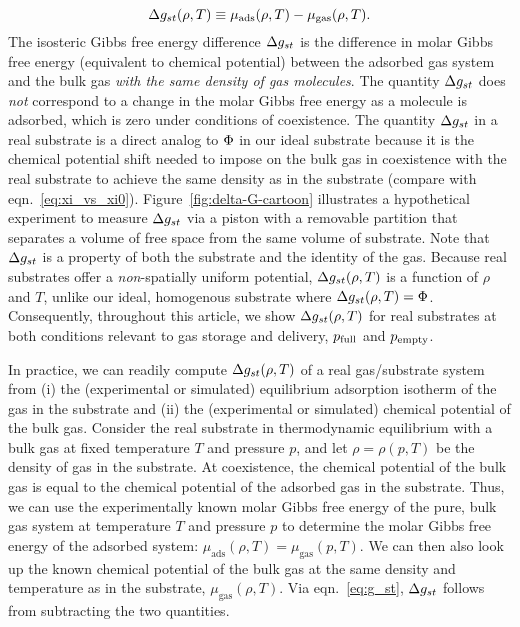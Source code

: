 \begin{equation}
   \Delta g_{st}(\rho, T) \equiv
    \mu_{\text{ads}}(\rho, T) - \mu_{\text{gas}}(\rho, T).
  \label{eq:g_st}
\end{equation}
The isosteric Gibbs free energy difference $\Delta g_{st}$ is the difference in molar
Gibbs free energy (equivalent to chemical potential) between the adsorbed gas system and
the bulk gas \emph{with the same density of gas molecules}. The quantity $\Delta g_{st}$
does \emph{not} correspond to a change in the molar Gibbs free energy as a
molecule is adsorbed, which is zero under conditions of coexistence. The
quantity $\Delta g_{st}$ in a real substrate is a direct analog to $\Phi$ in our ideal
substrate because it is the chemical potential shift needed to impose on the
bulk gas in coexistence with the real substrate to achieve the same density as
in the substrate (compare with eqn.~\ref{eq:xi_vs_xi0}).
Figure~\ref{fig:delta-G-cartoon} illustrates a hypothetical experiment to
measure $\Delta g_{st}$ via a piston with a removable partition that separates a volume
of free space from the same volume of substrate. Note that $\Delta g_{st}$ is a property
of both the substrate and the identity of the gas. Because real substrates
offer a \emph{non}-spatially uniform potential, $\Delta g_{st}(\rho, T)$ is a function
of $\rho$ and $T$, unlike our ideal, homogenous substrate where $\Delta g_{st}(\rho,
T)=\Phi$. Consequently, throughout this article, we show $\Delta g_{st}(\rho, T)$ for real
substrates at both conditions relevant to gas storage and delivery, $p_{\text{full}}$
and $p_{\text{empty}}$.

In practice, we can readily compute $\Delta g_{st}(\rho, T)$ of a real gas/substrate
system from (i) the (experimental or simulated) equilibrium adsorption isotherm
of the gas in the substrate and (ii) the (experimental or simulated) chemical
potential of the bulk gas. Consider the real substrate in thermodynamic
equilibrium with a bulk gas at fixed temperature $T$ and pressure $p$, and let
$\rho=\rho(p, T)$ be the density of gas in the substrate. At coexistence, the
chemical potential of the bulk gas is equal to the chemical potential of the
adsorbed gas in the substrate. Thus, we can use the experimentally known molar
Gibbs free energy of the pure, bulk gas system at temperature $T$ and pressure
$p$ to determine the molar Gibbs free energy of the adsorbed system:
$\mu_{\text{ads}}(\rho, T)=\mu_{\text{gas}}(p, T)$. We can then also look up
the known chemical potential of the bulk gas at the same density and
temperature as in the substrate, $\mu_{\text{gas}}(\rho, T)$. Via
eqn.~\ref{eq:g_st}, $\Delta g_{st}$ follows from subtracting the two quantities.

